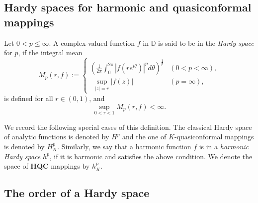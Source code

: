 \documentclass[11pt, reqno]{amsart}
\numberwithin{equation}{section}
\newcommand{\abs}[1]{\left\vert#1\right\vert}
\newcommand{\D}{\mbox{$\mathbb{D}$}}
\begin{document}



\subsection{Hardy spaces for harmonic and quasiconformal mappings}
Let $0<p \leq \infty$. A complex-valued function $f$ in $\D$ is said to be in the {\it Hardy space} for $p$, if the integral mean
 \[M_p(r,f):= \begin{cases}
\left(\frac{1}{2\pi}\int_0^{2\pi}\abs{f(re^{i\theta})}^pd\theta\right)^{\frac{1}{p}}&(0<p<\infty),\\ \ \
\sup\limits_{{\abs{z}=r}}\abs{f(z)}&(p=\infty),
\end{cases}\]
is defined for all $r\in(0,1)$, and
$$\sup\limits_{0<r<1}M_p(r, f)<\infty.$$ 

We record the following special cases of this definition. The classical Hardy space of analytic functions is denoted by $H^p$ 
and the one of $K$-quasiconformal mappings \cite{ak} is denoted by $H^p_K$. Similarly, we say that a harmonic function $f$ is in a \textit{harmonic Hardy space} $h^p$, if it is harmonic and satisfies the above condition. We denote the space of \textbf{HQC} mappings by $h^p_K$. 

\subsection{The order of a Hardy space} %
\end{document}
